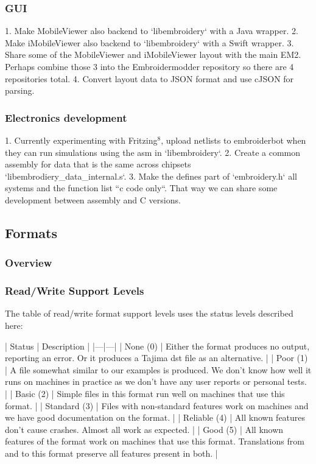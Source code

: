 \documentclass[a4paper, 11pt]{report}
\begin{document}
\subsubsection{GUI}

1. Make MobileViewer also backend to `libembroidery` with a Java wrapper.
2. Make iMobileViewer also backend to `libembroidery` with a Swift wrapper.
3. Share some of the MobileViewer and iMobileViewer layout with the main
   EM2. Perhaps combine those 3 into the Embroidermodder repository so there
   are 4 repositories total.
4. Convert layout data to JSON format and use cJSON for parsing.

\subsubsection{Electronics development}

1. Currently experimenting with Fritzing$^{8}$, upload netlists to embroiderbot
   when they can run simulations using the asm in `libembroidery`.
2. Create a common assembly for data that is the same across chipsets
   `libembrodiery\_data\_internal.s`.
3. Make the defines part of `embroidery.h` all systems and the function list
   ``c code only``. That way we can share some development between assembly and C
   versions.

\subsection{Formats}

\subsubsection{Overview}

\subsubsection{Read/Write Support Levels}

The table of read/write format support levels uses the status levels described here:

| Status | Description |
|---|---|
| None (0) | Either the format produces no output, reporting an error. Or it produces a Tajima dst file as an alternative. |
| Poor (1) | A file somewhat similar to our examples is produced. We don't know how well it runs on machines in practice as we don't have any user reports or personal tests. |
| Basic (2) | Simple files in this format run well on machines that use this format. |
| Standard (3) | Files with non-standard features work on machines and we have good documentation on the format. |
| Reliable (4) | All known features don't cause crashes. Almost all work as expected. |
| Good (5) | All known features of the format work on machines that use this format. Translations from and to this format preserve all features present in both. |
\end{document}

